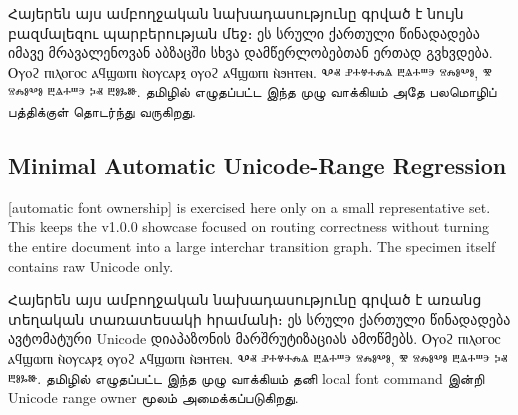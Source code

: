 Հայերեն այս ամբողջական նախադասությունը գրված է նույն բազմալեզու պարբերության մեջ։
ეს სრული ქართული წინადადება იმავე მრავალენოვან აბზაცში სხვა დამწერლობებთან ერთად გვხვდება.
Ⲟⲩⲟϩ ⲡⲓⲗⲟⲅⲟⲥ ⲁϥϣⲱⲡⲓ ⲛ̀ⲟⲩⲥⲁⲣⲝ ⲟⲩⲟϩ ⲁϥϣⲱⲡⲓ ⲛ̀ϧⲏⲧⲉⲛ.
Ⰲⱏ ⱀⰰⱍⰰⰾⱑ ⰱⱑⰰⱎⰵ ⱄⰾⱁⰲⱁ, ⰺ ⱄⰾⱁⰲⱁ ⰱⱑⰰⱎⰵ ⰽⱏ ⰱⱁⰳⱆ.
தமிழில் எழுதப்பட்ட இந்த முழு வாக்கியம் அதே பலமொழிப் பத்திக்குள் தொடர்ந்து வருகிறது.

\subsection{Minimal Automatic Unicode-Range Regression}

[automatic font ownership] is exercised here only on a small representative
set. This keeps the v1.0.0 showcase focused on routing correctness without
turning the entire document into a large interchar transition graph. The
specimen itself contains raw Unicode only.


Հայերեն այս ամբողջական նախադասությունը գրված է առանց տեղական տառատեսակի հրամանի։
ეს სრული ქართული წინადადება ავტომატური Unicode დიაპაზონის მარშრუტიზაციას ამოწმებს.
Ⲟⲩⲟϩ ⲡⲓⲗⲟⲅⲟⲥ ⲁϥϣⲱⲡⲓ ⲛ̀ⲟⲩⲥⲁⲣⲝ ⲟⲩⲟϩ ⲁϥϣⲱⲡⲓ ⲛ̀ϧⲏⲧⲉⲛ.
Ⰲⱏ ⱀⰰⱍⰰⰾⱑ ⰱⱑⰰⱎⰵ ⱄⰾⱁⰲⱁ, ⰺ ⱄⰾⱁⰲⱁ ⰱⱑⰰⱎⰵ ⰽⱏ ⰱⱁⰳⱆ.
தமிழில் எழுதப்பட்ட இந்த முழு வாக்கியம் தனி local font command இன்றி Unicode range owner மூலம் அமைக்கப்படுகிறது.


